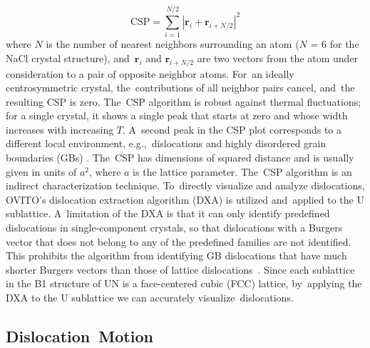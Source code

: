\documentclass[applsci,article,accept,pdftex,moreauthors]{Definitions/mdpi}
\newcommand{\?}{\stackrel{?}{=}}
\begin{document}
\begin{equation}
\mathrm{CSP} = \sum_{i=1}^{N/2} |\mathbf{r}_i + \mathbf{r}_{i+N/2}|^{2} 
\end{equation}
where $N$ is the number of nearest neighbors surrounding an atom ($N$ = 6 for the NaCl crystal structure), and~$\mathbf{r}_i$ and $\mathbf{r}_{i+N/2}$ are two vectors from the atom under consideration to a pair of opposite neighbor atoms. For~an ideally centrosymmetric crystal, the~contributions of all neighbor pairs cancel, and~the resulting CSP is zero. The~CSP algorithm is robust against thermal fluctuations; for a single crystal, it shows a single peak that starts at zero and whose width increases with increasing $T$. A~second peak in the CSP plot corresponds to a different local environment, e.g.,~dislocations and highly disordered grain boundaries (GBs) \cite{Bulatov2006, Larsen2020}. The~CSP has dimensions of squared distance and is usually given in units of $a^2$, where $a$ is the lattice parameter. The~CSP algorithm is an indirect characterization technique. To~directly visualize and analyze dislocations, OVITO's dislocation extraction algorithm (DXA) \cite{Stukowski2012} is utilized and~applied to the U sublattice. A~limitation of the DXA is that it can only identify predefined dislocations in single-component crystals, so that dislocations with a Burgers vector that does not belong to any of the predefined families are not identified. This prohibits the algorithm from identifying GB dislocations that have much shorter Burgers vectors than those of lattice dislocations~\cite{Cai2016}. Since each sublattice in the B1 structure of UN is a face-centered cubic (FCC) lattice, by~applying the DXA to the U sublattice we can accurately visualize~dislocations. 

\subsection{Dislocation~Motion}
\end{document}
